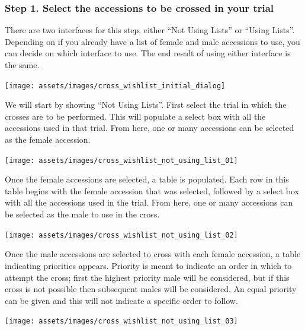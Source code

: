 \documentclass[
  12pt,
]{book}
\begin{document}
\hypertarget{step-1.-select-the-accessions-to-be-crossed-in-your-trial}{%
\subsubsection*{Step 1. Select the accessions to be crossed in your trial}\label{step-1.-select-the-accessions-to-be-crossed-in-your-trial}}


There are two interfaces for this step, either ``Not Using Lists'' or ``Using Lists''. Depending on if you already have a list of female and male accessions to use, you can decide on which interface to use. The end result of using either interface is the same.

\begin{center}\texttt{[image: assets/images/cross\_wishlist\_initial\_dialog]} \end{center}

We will start by showing ``Not Using Lists''. First select the trial in which the crosses are to be performed. This will populate a select box with all the accessions used in that trial. From here, one or many accessions can be selected as the female accession.

\begin{center}\texttt{[image: assets/images/cross\_wishlist\_not\_using\_list\_01]} \end{center}

Once the female accessions are selected, a table is populated. Each row in this table begins with the female accession that was selected, followed by a select box with all the accessions used in the trial. From here, one or many accessions can be selected as the male to use in the cross.

\begin{center}\texttt{[image: assets/images/cross\_wishlist\_not\_using\_list\_02]} \end{center}

Once the male accessions are selected to cross with each female accession, a table indicating priorities appears. Priority is meant to indicate an order in which to attempt the cross; first the highest priority male will be considered, but if this cross is not possible then subsequent males will be considered. An equal priority can be given and this will not indicate a specific order to follow.

\begin{center}\texttt{[image: assets/images/cross\_wishlist\_not\_using\_list\_03]} \end{center}
\end{document}
